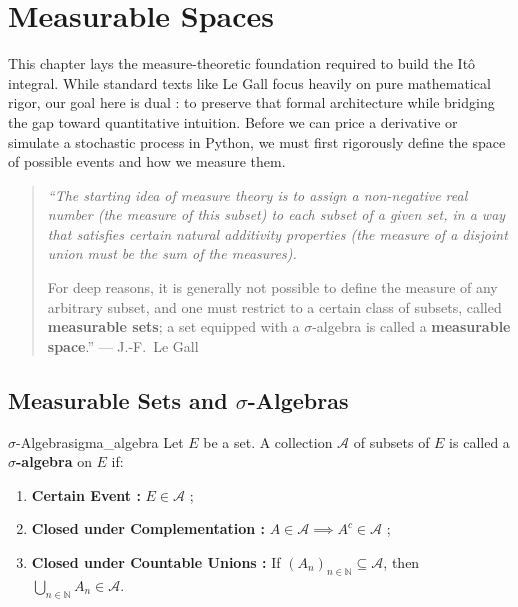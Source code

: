 \chapter{Measurable Spaces}

This chapter lays the measure-theoretic foundation required to build the Itô integral. 
While standard texts like Le Gall focus heavily on pure mathematical rigor, our goal here is dual : 
to preserve that formal architecture while bridging the gap toward quantitative intuition. 
Before we can price a derivative or simulate a stochastic process in Python, we must first rigorously define the space of possible events and how we measure them.

\begin{quote}
\itshape
``The starting idea of measure theory is to assign a non-negative real number (the measure of this subset) to each subset of a given set, in a way that satisfies certain natural additivity properties (the measure of a disjoint union must be the sum of the measures). 

For deep reasons, it is generally not possible to define the measure of any arbitrary subset, and one must restrict to a certain class of subsets, called \textbf{measurable sets}; a set equipped with a $\sigma$-algebra is called a \textbf{measurable space}.''
\hfill --- J.-F.~Le Gall~\cite{legall2006}
\end{quote}

\section{Measurable Sets and $\sigma$-Algebras}



\begin{definition}{$\sigma$-Algebra}{sigma_algebra}
Let $E$ be a set. 
A collection $\mathcal{A}$ of subsets of $E$ is called a \textbf{$\sigma$-algebra} on $E$ if:
\begin{enumerate}[label=(\textbf{\roman*})]
    \item \textbf{Certain Event :} $E \in \mathcal{A}$ ;
    \item \textbf{Closed under Complementation :} $A \in \mathcal{A} \implies A^c \in \mathcal{A}$ ;
    \item \textbf{Closed under Countable Unions :} If $(A_n)_{n \in \mathbb{N}} \subseteq \mathcal{A}$, then $\bigcup_{n \in \mathbb{N}} A_n \in \mathcal{A}$.
\end{enumerate}
\end{definition}

